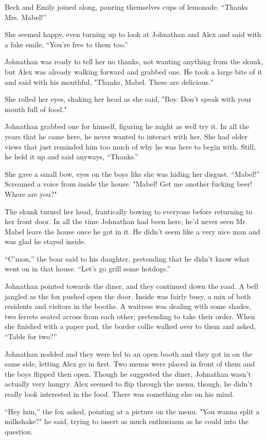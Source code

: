 Beck and Emily joined along, pouring themselves cups of lemonade.
``Thanks Mrs. Mabel!''

She seemed happy, even turning up to look at Johnathan and Alex and said
with a fake smile, ``You're free to them too.''

Johnathan was ready to tell her no thanks, not wanting anything from the
skunk, but Alex was already walking forward and grabbed one. He took a
large bite of it and said with his mouthful, "Thanks, Mabel. These are
delicious."

She rolled her eyes, shaking her head as she said, "Boy. Don't speak
with your mouth full of food."

Johnathan grabbed one for himself, figuring he might as well try it. In
all the years that he came here, he never wanted to interact with her.
She had older views that just reminded him too much of why he was here
to begin with. Still, he held it up and said anyways, ``Thanks.''

She gave a small bow, eyes on the boys like she was hiding her disgust.
``Mabel!'' Screamed a voice from inside the house. "Mabel! Get me another
fucking beer! Where are you?"

The skunk turned her head, frantically bowing to everyone before
returning to her front door. In all the time Johnathan had been here,
he'd never seen Mr. Mabel leave the house once he got in it. He didn't
seem like a very nice man and was glad he stayed inside.

``C'mon,'' the boar said to his daughter, pretending that he didn't know
what went on in that house. ``Let's go grill some hotdogs.''

Johnathan pointed towards the diner, and they continued down the road. A
bell jangled as the fox pushed open the door. Inside was fairly busy, a
mix of both residents and visitors in the booths. A waitress was dealing
with some shades, two ferrets seated across from each other, pretending
to take their order. When she finished with a paper pad, the border
collie walked over to them and asked, ``Table for two?''

Johnathan nodded and they were led to an open booth and they got in on
the same side, letting Alex go in first. Two menus were placed in front
of them and the boys flipped then open. Though he suggested the diner,
Johnathan wasn't actually very hungry. Alex seemed to flip through the
menu, though, he didn't really look interested in the food. There was
something else on his mind.

``Hey hun,'' the fox asked, pointing at a picture on the menu. "You wanna
split a milkshake?" he said, trying to insert as much enthusiasm as he
could into the question.

